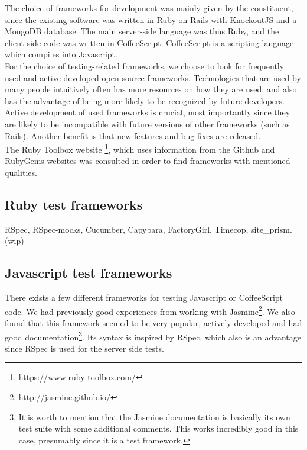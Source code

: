 \MakeShortVerb{\|}

The choice of frameworks for development was mainly given by the
constituent, since the existing software was written in Ruby on Rails
with KnockoutJS and a MongoDB database. The main server-side language
was thus Ruby, and the client-side code was written in CoffeeScript.
CoffeeScript is a scripting language which compiles into Javascript.\\

For the choice of testing-related frameworks, we choose to look for
frequently used and active developed open source frameworks.
Technologies that are used by many people intuitively often has more
resources on how they are used, and also has the advantage of being more
likely to be recognized by future developers. Active development of used
frameworks is crucial, most importantly since they are likely to be
incompatible with future versions of other frameworks (such as Rails).
Another benefit is that new features and bug fixes are released.\\

The Ruby Toolbox website \footnote{\url{https://www.ruby-toolbox.com/}},
which uses information from the Github and RubyGems websites was
consulted in order to find frameworks with mentioned qualities.\\

\subsection{Ruby test frameworks}
RSpec, RSpec-mocks, Cucumber, Capybara, FactoryGirl, Timecop, site\_prism. (wip)


\subsection{Javascript test frameworks}

There exists a few different frameworks for testing Javascript or
CoffeeScript code. We had previously good experiences from working with
Jasmine\footnote{\url{http://jasmine.github.io/}}. We also found that
this framework seemed to be very popular, actively developed and had
good documentation\footnote{It is worth to mention that the Jasmine
documentation is basically its own test suite with some additional
comments. This works incredibly good in this case, presumably since it
is a test framework.}. Its syntax is inspired by RSpec, which also is an
advantage since RSpec is used for the server side tests.\\


